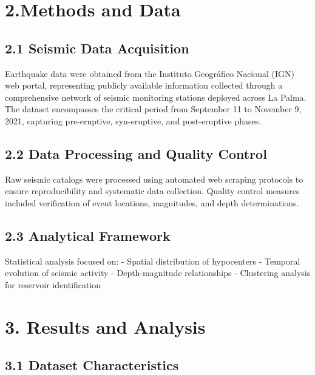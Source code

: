 \documentclass[
  letterpaper,
]{book}
\begin{document}

\chapter{2.Methods and Data}\label{methods-and-data}

\section{2.1 Seismic Data Acquisition}\label{seismic-data-acquisition}

Earthquake data were obtained from the Instituto Geográfico Nacional
(IGN) web portal, representing publicly available information collected
through a comprehensive network of seismic monitoring stations deployed
across La Palma. The dataset encompasses the critical period from
September 11 to November 9, 2021, capturing pre-eruptive, syn-eruptive,
and post-eruptive phases.

\section{2.2 Data Processing and Quality
Control}\label{data-processing-and-quality-control}

Raw seismic catalogs were processed using automated web scraping
protocols to ensure reproducibility and systematic data collection.
Quality control measures included verification of event locations,
magnitudes, and depth determinations.

\section{2.3 Analytical Framework}\label{analytical-framework}

Statistical analysis focused on: - Spatial distribution of hypocenters -
Temporal evolution of seismic activity - Depth-magnitude relationships -
Clustering analysis for reservoir identification


\chapter{3. Results and Analysis}\label{results-and-analysis}

\section{3.1 Dataset Characteristics}\label{dataset-characteristics}
\end{document}
